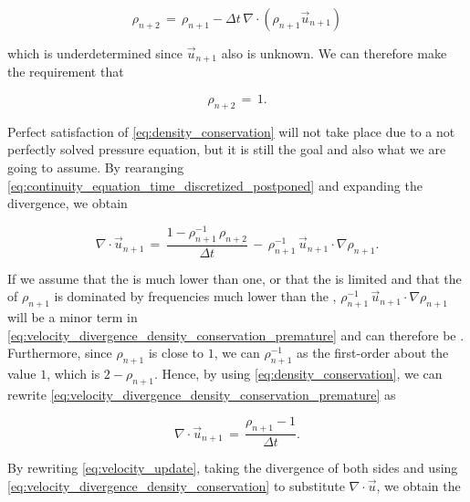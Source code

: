 \begin{equation} \label{eq:continuity_equation_time_discretized_postponed}
\rho_{n+2} \,=\, \rho_{n+1} - \Delta t\,\nabla\cdot(\rho_{n+1}\vec{u}_{n+1})
\end{equation}

which is underdetermined since $\vec{u}_{n+1}$ also is unknown. We can therefore make the requirement that

\begin{equation} \label{eq:density_conservation}
\rho_{n+2} \,=\, 1.
\end{equation}

Perfect satisfaction of \eqref{eq:density_conservation} will not take place due to a not perfectly solved pressure equation, but it is still the goal and also what we are going to assume. By rearanging \eqref{eq:continuity_equation_time_discretized_postponed} and expanding the divergence, we obtain

\begin{equation} \label{eq:velocity_divergence_density_conservation_premature}
\nabla\cdot\vec{u}_{n+1} \,=\, \frac{1-\rho_{n+1}^{-1}\,\rho_{n+2}}{\Delta t} \,-\, \rho_{n+1}^{-1}\,\vec{u}_{n+1}\cdot\nabla\rho_{n+1}.
\end{equation}

If we assume that the  is much lower than one, or that the  is limited and that the \spectrum of $\rho_{n+1}$ is dominated by frequencies much lower than the , $\rho_{n+1}^{-1}\,\vec{u}_{n+1}\cdot\nabla\rho_{n+1}$ will be a minor term in \eqref{eq:velocity_divergence_density_conservation_premature} and can therefore be \neglected. Furthermore, since $\rho_{n+1}$ is close to $1$, we can \approximate $\rho_{n+1}^{-1}$ as the first-order  about the value $1$, which is $2-\rho_{n+1}$. Hence, by using \eqref{eq:density_conservation}, we can rewrite \eqref{eq:velocity_divergence_density_conservation_premature} as

\begin{equation} \label{eq:velocity_divergence_density_conservation}
\nabla\cdot\vec{u}_{n+1} \,=\, \frac{\rho_{n+1}-1}{\Delta t}.
\end{equation}

By rewriting \eqref{eq:velocity_update}, taking the divergence of both sides and using \eqref{eq:velocity_divergence_density_conservation} to substitute $\nabla\cdot\vec{u}$, we obtain the 

